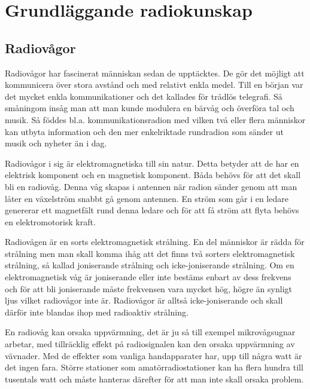 \documentclass[12ypt,swedish,a4paper]{report}
\begin{document}
\cfoot{\thepage}

\renewcommand{\headrulewidth}{0.6pt}
\renewcommand{\footrulewidth}{1.2pt}

\chapter{Grundläggande radiokunskap}

\section{Radiovågor}

Radiovågor har fascinerat människan sedan de upptäcktes. De gör det möjligt att kommunicera över stora avstånd och med relativt enkla medel. Till en början var det mycket enkla kommunikationer och det kallades för trådlös telegrafi. Så småningom insåg man att man kunde modulera en bärvåg och överföra tal och musik. Så föddes bl.a. kommunikationsradion med vilken två eller flera människor kan utbyta information och den mer enkelriktade rundradion som sänder ut musik och nyheter än i dag.

Radiovågor i sig är elektromagnetiska till sin natur. Detta betyder att de har en elektrisk komponent och en magnetisk komponent. Båda behövs för att det skall bli en radiovåg. Denna våg skapas i antennen när radion sänder genom att man låter en växelström snabbt gå genom antennen. En ström som går i en ledare genererar ett magnetfält rund denna ledare och för att få ström att flyta behövs en elektromotorisk kraft.

Radiovågen är en sorts elektromagnetisk strålning. En del människor är rädda för strålning men man skall komma ihåg att det finns två sorters elektromagnetisk strålning, så kallad joniserande strålning och icke-joniserande strålning. Om en elektromagnetisk våg är joniserande eller inte bestäms enbart av dess frekvens och för att bli joniserande måste frekvensen vara mycket hög, högre än synligt ljus vilket radiovågor inte är. Radiovågor är alltså icke-joniserande och skall därför inte blandas ihop med radioaktiv strålning.

En radiovåg kan orsaka uppvärmning, det är ju så till exempel mikrovågsugnar arbetar, med tillräcklig effekt på radiosignalen kan den orsaka uppvärmning av vävnader. Med de effekter som vanliga handapparater har, upp till några watt är det ingen fara. Större stationer som amatörradiostationer kan ha flera hundra till tusentals watt och måste hanteras därefter för att man inte skall orsaka problem.
\end{document}
